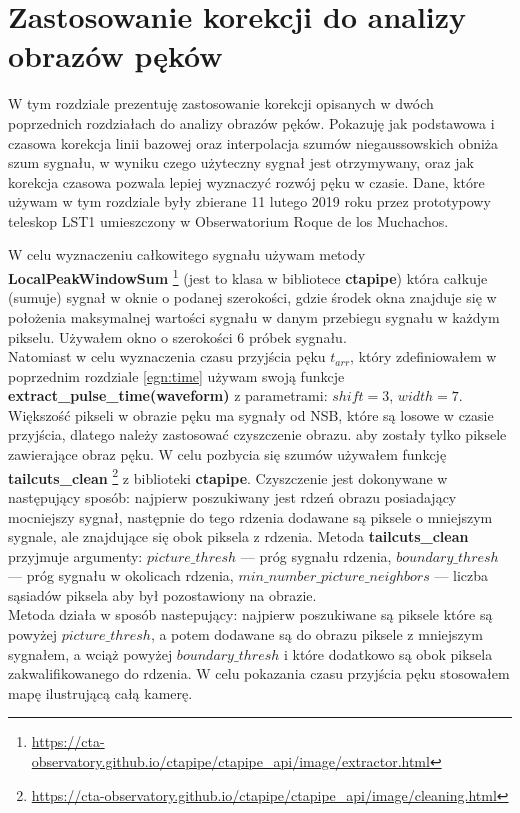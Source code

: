 \documentclass[a4paper,11pt,twoside]{article}
\begin{document}
\newpage
\section{Zastosowanie korekcji do analizy obrazów pęków}
W tym rozdziale prezentuję zastosowanie korekcji opisanych w dwóch poprzednich rozdziałach do analizy obrazów pęków. Pokazuję jak podstawowa i czasowa korekcja linii bazowej oraz interpolacja szumów niegaussowskich obniża szum sygnału, w wyniku czego użyteczny sygnał jest otrzymywany, oraz jak korekcja czasowa pozwala lepiej wyznaczyć rozwój pęku w czasie. Dane, które używam w tym rozdziale były zbierane 11 lutego 2019 roku przez prototypowy teleskop LST1 umieszczony w Obserwatorium Roque de los Muchachos. 

W celu wyznaczeniu całkowitego sygnału używam metody {\bf{LocalPeakWindowSum}} \footnote{\url{https://cta-observatory.github.io/ctapipe/ctapipe_api/image/extractor.html}} (jest to klasa w bibliotece {\bf{ctapipe}}) która całkuje (sumuje) sygnał w oknie o podanej szerokości, gdzie środek okna znajduje się w położenia maksymalnej wartości sygnału w danym przebiegu sygnału w każdym pikselu. Używałem okno o szerokości 6 próbek sygnału. \\ 
Natomiast w celu wyznaczenia czasu przyjścia pęku $t_{arr}$, który zdefiniowałem w poprzednim rozdziale \ref{egn:time} używam swoją funkcje {\bf{extract\_pulse\_time(waveform)}} z parametrami: $shift = 3$, $width = 7$. \\
Większość pikseli w obrazie pęku ma sygnały od NSB, które są losowe w czasie przyjścia, dlatego należy zastosować czyszczenie obrazu. aby zostały tylko piksele zawierające obraz pęku. W celu pozbycia się szumów używałem funkcję {\bf{tailcuts\_clean}} \footnote{ \url{https://cta-observatory.github.io/ctapipe/ctapipe_api/image/cleaning.html}} z biblioteki {\bf{ctapipe}}. Czyszczenie jest dokonywane w następujący sposób: najpierw poszukiwany jest rdzeń obrazu posiadający mocniejszy sygnał, następnie do tego rdzenia dodawane są piksele o mniejszym sygnale, ale znajdujące się obok piksela z rdzenia. Metoda {\bf{tailcuts\_clean}} przyjmuje argumenty: $picture\_thresh$ --- próg sygnału rdzenia, $boundary\_thresh$ --- próg sygnału w okolicach rdzenia, $min\_number\_picture\_neighbors$ --- liczba sąsiadów piksela aby był pozostawiony na obrazie. \\
Metoda działa w sposób nastepujący: najpierw poszukiwane są piksele które są powyżej $picture\_thresh$, a potem dodawane są do obrazu piksele z mniejszym sygnałem, a wciąż  powyżej $boundary\_thresh$ i które dodatkowo są obok piksela zakwalifikowanego do rdzenia.
W celu pokazania czasu przyjścia pęku stosowałem mapę ilustrującą całą kamerę.
\end{document}
